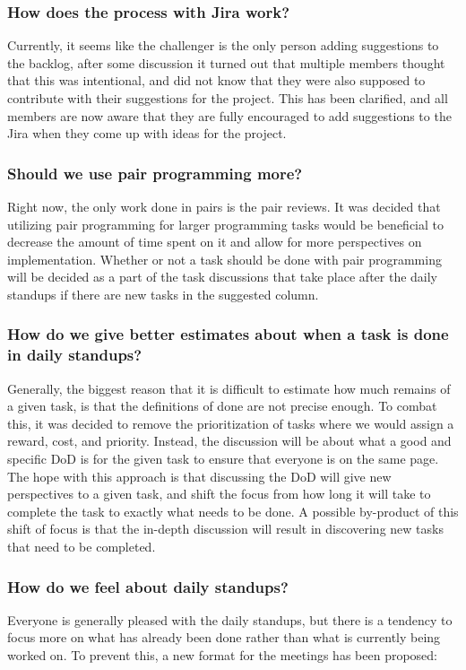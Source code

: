\subsubsection{How does the process with Jira work?}
Currently, it seems like the challenger is the only person adding suggestions to the backlog, after some discussion it turned out that multiple members thought that this was intentional, and did not know that they were also supposed to contribute with their suggestions for the project.
This has been clarified, and all members are now aware that they are fully encouraged to add suggestions to the Jira when they come up with ideas for the project.

\subsubsection{Should we use pair programming more?}
Right now, the only work done in pairs is the pair reviews.
It was decided that utilizing pair programming for larger programming tasks would be beneficial to decrease the amount of time spent on it and allow for more perspectives on implementation.
Whether or not a task should be done with pair programming will be decided as a part of the task discussions that take place after the daily standups if there are new tasks in the suggested column.

\subsubsection{How do we give better estimates about when a task is done in daily standups?}
Generally, the biggest reason that it is difficult to estimate how much remains of a given task, is that the definitions of done are not precise enough.
To combat this, it was decided to remove the prioritization of tasks where we would assign a reward, cost, and priority.
Instead, the discussion will be about what a good and specific DoD is for the given task to ensure that everyone is on the same page.
The hope with this approach is that discussing the DoD will give new perspectives to a given task, and shift the focus from how long it will take to complete the task to exactly what needs to be done.
A possible by-product of this shift of focus is that the in-depth discussion will result in discovering new tasks that need to be completed.

\subsubsection{How do we feel about daily standups?}
Everyone is generally pleased with the daily standups, but there is a tendency to focus more on what has already been done rather than what is currently being worked on.
To prevent this, a new format for the meetings has been proposed:

